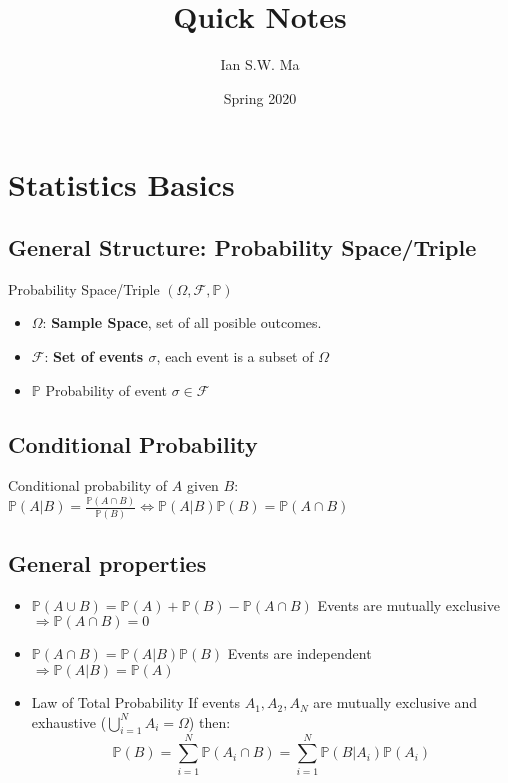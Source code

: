 \documentclass[12pt]{article}
\title{\coursename\\Quick Notes}
\author{Ian S.W. Ma}
\date{Spring 2020}
\theoremstyle{definition}
\newcommand{\Prob}[1]{\mathbb{P}(#1)}
\begin{document}
\maketitle
\tableofcontents
\newpage

\setcounter{page}{1}

\section{Statistics Basics}
    \subsection*{General Structure: Probability Space/Triple}
    Probability Space/Triple $(\Omega, \mathcal{F}, \mathbb{P})$
    \begin{itemize}
        \item $\Omega$: \textbf{Sample Space}, set of all posible outcomes.
        \item $\mathcal{F}$: \textbf{Set of events \(\sigma\)}, each event is a subset of $\Omega$
        \item $\mathbb{P}$ Probability of event $\sigma \in \mathcal{F}$
    \end{itemize}
    \subsection*{Conditional Probability}
    Conditional probability of $A$ given $B$: $\Prob{A|B} = \frac{\Prob{A \cap B}}{\Prob{B}} \Leftrightarrow \Prob{A|B}\Prob{B} = \Prob{A \cap B}$
    \subsection*{General properties}
    \begin{itemize}
        \item $\Prob{A \cup B} = \Prob{A} + \Prob{B} - \Prob{A \cap B}$
            \subitem Events are mutually exclusive $\Rightarrow \Prob{A \cap B} = 0$
        \item $\Prob{A \cap B} = \Prob{A|B}\Prob{B}$
            \subitem Events are independent $\Rightarrow \Prob{A|B} = \Prob{A}$
        \item Law of Total Probability
            \subitem If events $A_1, A_2, A_N$ are mutually exclusive and exhaustive ($\bigcup_{i = 1}^N A_i = \Omega$) then:
            $$\Prob{B} = \sum_{i=1}^N \Prob{A_i \cap B} = \sum_{i=1}^N \Prob{B|A_i}\Prob{A_i}$$
    \end{itemize}
\end{document}
